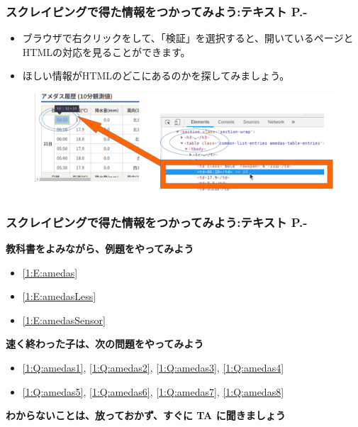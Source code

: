 \documentclass[dvipdfmx]{beamer}
\begin{document}
\begin{frame}[fragile]
	\frametitle{\large{スクレイピングで得た情報をつかってみよう:テキスト P.\pageref{1:P:scraping}-}~~~}
    \begin{itemize}
        \item ブラウザで右クリックをして、「検証」を選択すると、開いているページとHTMLの対応を見ることができます。
        \item ほしい情報がHTMLのどこにあるのかを探してみましょう。
    \end{itemize}
    \begin{figure}
      \centering
      \includegraphics[width=\textwidth]{slide08-img008.png}
    \end{figure}
\end{frame}

\begin{frame}[fragile]
	\frametitle{\large{スクレイピングで得た情報をつかってみよう:テキスト P.\pageref{1:P:scraping}-}~~~}
      \large\textbf{教科書をよみながら、例題をやってみよう}
				\begin{itemize}
					\item \ref*{1:E:amedas}
					\item \ref*{1:E:amedasLess}
					\item \ref*{1:E:amedasSensor}
				\end{itemize}
      \vfill
      \large\textbf{速く終わった子は、次の問題をやってみよう}
				\begin{itemize}
					\item \ref*{1:Q:amedas1}, \ref*{1:Q:amedas2}, \ref*{1:Q:amedas3}, \ref*{1:Q:amedas4}
					\item \ref*{1:Q:amedas5}, \ref*{1:Q:amedas6}, \ref*{1:Q:amedas7}, \ref*{1:Q:amedas8}
				\end{itemize}
      \vfill
      \large\textbf{わからないことは、放っておかず、すぐに TA に聞きましょう}
\end{frame}
\end{document}
